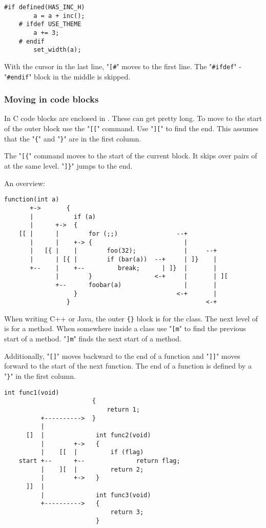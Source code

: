 \begin{Verbatim}[samepage=true]
    #if defined(HAS_INC_H) 
        a = a + inc(); 
    # ifdef USE_THEME 
        a += 3; 
    # endif 
        set_width(a); 
\end{Verbatim}

With the cursor in the last line, "\verb![#!" moves to the first line.
The "\verb!#ifdef!" - "\verb!#endif!" block in the middle is skipped.
\subsubsection{Moving in code blocks}
In C code blocks are enclosed in {}.
These can get pretty long.
To move to the start of the outer block use the "\verb![[!" command.
Use "\verb!][!" to find the end.
This assumes that the "\verb!{!" and "\verb!}!" are in the first column.

The "\verb![{!" command moves to the start of the current block.
It skips over pairs of {} at the same level.
"\verb!]}!" jumps to the end.

An overview:

\begin{Verbatim}[samepage=true]
                 function(int a)
       +->       {
       |           if (a)
       |      +->  {
    [[ |      |        for (;;)                --+
       |      |    +-> {                         |
       |   [{ |    |        foo(32);             |     --+
       |      | [{ |        if (bar(a))  --+     | ]}    |
       +--    |    +--         break;      | ]}  |       |
              |        }                 <-+     |       | ][
              +--      foobar(a)                 |       |
                   }                           <-+       |
                 }                                     <-+
\end{Verbatim}

When writing C++ or Java, the outer \verb!{}! block is for the class.
The next level of {} is for a method.
When somewhere inside a class use "\verb![m!" to find the previous start of a method.
"\verb!]m!" finds the next start of a method.

Additionally, "\verb![]!" moves backward to the end of a function and "\verb!]]!" moves forward to the start of the next function.
The end of a function is defined by a "\verb!}!" in the first column.

\begin{Verbatim}[samepage=true]
                        int func1(void)
                        {
                            return 1;
          +---------->  }
          |
      []  |              int func2(void)
          |        +->   {
          |    [[  |         if (flag)
    start +--      +--              return flag;
          |    ][  |         return 2;
          |        +->   }
      ]]  |
          |              int func3(void)
          +---------->   {
                             return 3;
                         }
\end{Verbatim}

